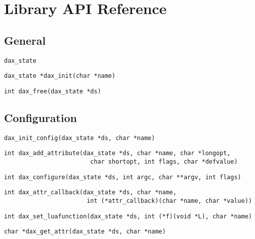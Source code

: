\chapter{Library API Reference}
\section{General}
\begin{verbatim}
dax_state
\end{verbatim}

\begin{verbatim}
dax_state *dax_init(char *name)
\end{verbatim}

\begin{verbatim}
int dax_free(dax_state *ds)
\end{verbatim}

\section{Configuration}

\begin{verbatim}
dax_init_config(dax_state *ds, char *name)
\end{verbatim}

\begin{verbatim}
int dax_add_attribute(dax_state *ds, char *name, char *longopt,
                        char shortopt, int flags, char *defvalue)
\end{verbatim}

\begin{verbatim}
int dax_configure(dax_state *ds, int argc, char **argv, int flags)
\end{verbatim}

\begin{verbatim}
int dax_attr_callback(dax_state *ds, char *name,
                       int (*attr_callback)(char *name, char *value))
\end{verbatim}

\begin{verbatim}
int dax_set_luafunction(dax_state *ds, int (*f)(void *L), char *name)
\end{verbatim}

\begin{verbatim}
char *dax_get_attr(dax_state *ds, char *name)
\end{verbatim}

